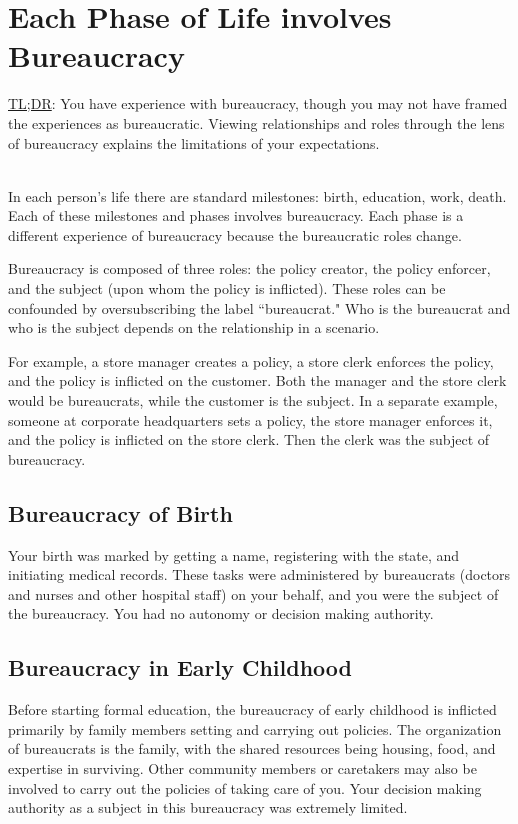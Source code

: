 \section{Each Phase of Life involves Bureaucracy}

\href{https://en.wikipedia.org/wiki/TL;DR}{TL;DR}: 
You have experience with bureaucracy, though you may not have framed the experiences as bureaucratic. Viewing relationships and roles through the lens of bureaucracy explains the limitations of your expectations.

\ \\

In each person's life there are standard milestones: birth, education, work, death. 
Each of these milestones and phases involves bureaucracy. Each phase is a different experience of bureaucracy because the bureaucratic roles change.

Bureaucracy is composed of three roles: the policy creator, the policy enforcer, and the subject (upon whom the policy is inflicted). 
These roles can be confounded by oversubscribing the label ``bureaucrat." Who is the bureaucrat and who is the subject depends on the relationship in a scenario. 

For example, a store manager creates a policy, a store clerk enforces the policy, 
and the policy is inflicted on the customer. Both the manager and the store clerk would be bureaucrats, while the customer is the subject. In a separate example, someone at corporate headquarters sets a policy, the store manager enforces it, and the policy is inflicted on the store clerk. Then the clerk was the subject of bureaucracy. 


\subsection*{Bureaucracy of Birth\label{sec:bureacracy-of-birth}}
Your birth was marked by getting a name, registering with the state, and initiating medical records. These tasks were administered by bureaucrats (doctors and nurses and other hospital staff) on your behalf, and you were the subject of the bureaucracy. You had no autonomy or decision making authority. 

\subsection*{Bureaucracy in Early Childhood\label{sec:bureaucracy-early-childhood}}
Before starting formal education, the bureaucracy of early childhood is inflicted primarily by family members setting and carrying out policies. The organization of bureaucrats is the family, with the shared resources being housing, food, and expertise in surviving. Other community members or caretakers may also be involved to carry out the policies of taking care of you. Your decision making authority as a subject in this bureaucracy was extremely limited. 

